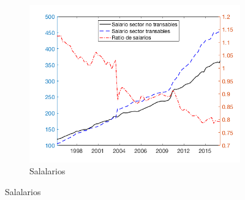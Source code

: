\documentclass{beamer}
\begin{document}
\begin{frame}
\begin{figure}
    ~ %
    \begin{subfigure}[b]{0.4\textwidth}
        \includegraphics[width=\textwidth]{fig13}
        \caption{\tiny Salalarios}
    \end{subfigure}
\end{figure}
\end{frame}

    ~ %
    ~ %
        ~ %
\end{document}
